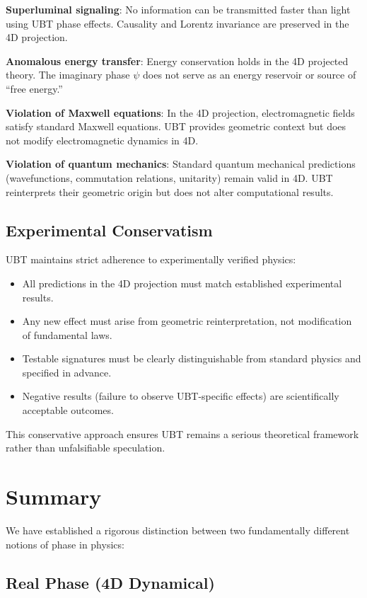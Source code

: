 \documentclass[12pt]{article}
\begin{document}
\textbf{Superluminal signaling}: No information can be transmitted faster than light using UBT phase effects. Causality and Lorentz invariance are preserved in the 4D projection.

\textbf{Anomalous energy transfer}: Energy conservation holds in the 4D projected theory. The imaginary phase $\psi$ does not serve as an energy reservoir or source of ``free energy.''

\textbf{Violation of Maxwell equations}: In the 4D projection, electromagnetic fields satisfy standard Maxwell equations. UBT provides geometric context but does not modify electromagnetic dynamics in 4D.

\textbf{Violation of quantum mechanics}: Standard quantum mechanical predictions (wavefunctions, commutation relations, unitarity) remain valid in 4D. UBT reinterprets their geometric origin but does not alter computational results.

\subsection{Experimental Conservatism}

UBT maintains strict adherence to experimentally verified physics:
\begin{itemize}
\item All predictions in the 4D projection must match established experimental results.
\item Any new effect must arise from geometric reinterpretation, not modification of fundamental laws.
\item Testable signatures must be clearly distinguishable from standard physics and specified in advance.
\item Negative results (failure to observe UBT-specific effects) are scientifically acceptable outcomes.
\end{itemize}

This conservative approach ensures UBT remains a serious theoretical framework rather than unfalsifiable speculation.

\section{Summary}

We have established a rigorous distinction between two fundamentally different notions of phase in physics:

\subsection{Real Phase (4D Dynamical)}
\end{document}

